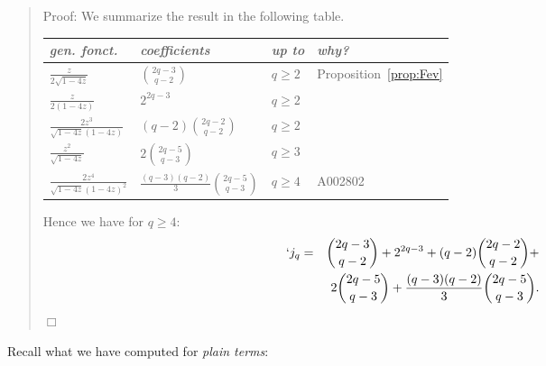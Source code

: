 \documentclass[preprint,authoryear]{elsarticle}
\newenvironment{proof}[1]{\begin{quotation}\noindent\textsf{Proof:} #1}{\(\Box\)\end{quotation}}
\begin{document}
\begin{proof}{}
We summarize the result in the following table.

\medskip

\begin{center}
  \begin{tabular}{l| l | l |l}
    \textit{gen. fonct.} & \textit{coefficients} & \textit{up to}& \textit{why?} \\\hline\hline
    $\frac{z}{2\sqrt{1-4z}}$ & ${2q-3 \choose q-2}$ & $q\ge 2$ & Proposition~\ref{prop:Fev} \\\hline
    $\frac{z}{2(1-4z)}$ &  $2^{2q-3}$ &  $q\ge 2$ \\\hline
    $\frac{2z^3 }{\sqrt{1-4z}(1-4z)}$ & $(q-2){2q-2 \choose q-2}$& $q \ge 2$\\\hline
    $\frac{z^2}{\sqrt{1-4z}}$ & $2{2q-5 \choose q-3}$ & $q\ge 3$\\\hline
    $\frac{2z^4}{\sqrt{1-4z}(1-4z)^2}$ &  $\frac{(q-3)(q-2)}{3}{2q-5 \choose q-3}$& $q\ge 4$& \textsf{A002802}\\\hline
  \end{tabular}
\end{center}

\medskip

Hence we have for $q\ge 4$:
\begin{eqnarray*}
  `j_{q} &=& {2q-3 \choose q-2} + 2^{2q-3} + (q-2){2q-2 \choose q-2} + \\
  && 2{2q-5 \choose q-3} + \frac{(q-3)(q-2)}{3}{2q-5 \choose q-3}.
\end{eqnarray*}
\end{proof}
Recall what we have computed for\textit{ plain terms}:
\end{document}
